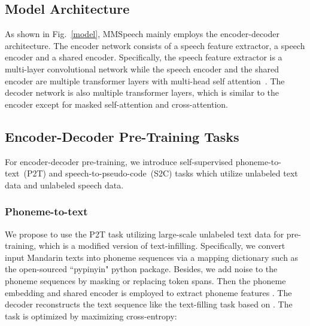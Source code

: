 \documentclass{article}
\begin{document}
\subsection{Model Architecture}
As shown in Fig.~\ref{model}, MMSpeech mainly employs the encoder-decoder architecture. The encoder network consists of a speech feature extractor, a speech encoder and a shared encoder. Specifically, the speech feature extractor is a multi-layer convolutional network while the speech encoder and the shared encoder are multiple transformer layers with multi-head self attention~\cite{vaswani2017attention}. The decoder network is also multiple transformer layers, which is similar to the encoder except for masked self-attention and cross-attention.

\subsection{Encoder-Decoder Pre-Training Tasks}
\label{sec:dec-pre}
For encoder-decoder pre-training, we introduce self-supervised phoneme-to-text~(P2T) and speech-to-pseudo-code~(S2C) tasks which utilize unlabeled text data and unlabeled speech data.

\subsubsection{Phoneme-to-text}
We propose to use the P2T task utilizing large-scale unlabeled text data for pre-training, which is a modified version of text-infilling. 
Specifically, we convert input Mandarin texts into phoneme sequences via a mapping dictionary such as the open-sourced ``pypinyin" python package. Besides, we add noise to the phoneme sequences by masking or replacing token spans. Then the phoneme embedding  and shared encoder is employed to extract phoneme features . 
The decoder reconstructs the text sequence  like the text-filling task based on . The task is optimized by maximizing cross-entropy:
\end{document}
